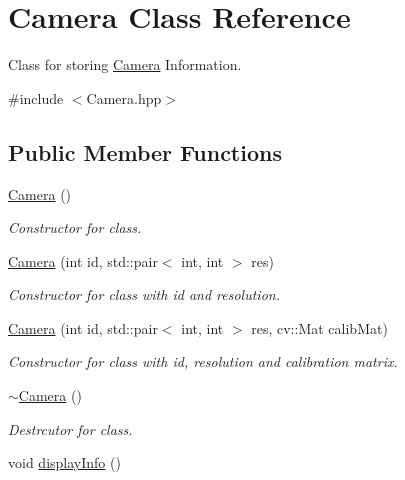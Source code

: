 \hypertarget{classCamera}{}\section{Camera Class Reference}
\label{classCamera}


Class for storing \hyperlink{classCamera}{Camera} Information.  




{\ttfamily \#include $<$Camera.\+hpp$>$}

\subsection*{Public Member Functions}
\begin{DoxyCompactItemize}
\item 
\hyperlink{classCamera_a01f94c3543f56ede7af49dc778f19331}{Camera} ()\hypertarget{classCamera_a01f94c3543f56ede7af49dc778f19331}{}\label{classCamera_a01f94c3543f56ede7af49dc778f19331}

\begin{DoxyCompactList}\small\item\em Constructor for class. \end{DoxyCompactList}\item 
\hyperlink{classCamera_a269c89c4173abede022f61f662d9343b}{Camera} (int id, std\+::pair$<$ int, int $>$ res)
\begin{DoxyCompactList}\small\item\em Constructor for class with id and resolution. \end{DoxyCompactList}\item 
\hyperlink{classCamera_a3e25c1208e4cb1fed69b7750a8ee918b}{Camera} (int id, std\+::pair$<$ int, int $>$ res, cv\+::\+Mat calib\+Mat)
\begin{DoxyCompactList}\small\item\em Constructor for class with id, resolution and calibration matrix. \end{DoxyCompactList}\item 
\hyperlink{classCamera_ad1897942d0ccf91052386388a497349f}{$\sim$\+Camera} ()\hypertarget{classCamera_ad1897942d0ccf91052386388a497349f}{}\label{classCamera_ad1897942d0ccf91052386388a497349f}

\begin{DoxyCompactList}\small\item\em Destrcutor for class. \end{DoxyCompactList}\item 
void \hyperlink{classCamera_ace29bb6ed733ab52f33a6896c2615ba8}{display\+Info} ()\hypertarget{classCamera_ace29bb6ed733ab52f33a6896c2615ba8}{}\label{classCamera_ace29bb6ed733ab52f33a6896c2615ba8}


\end{DoxyCompactItemize}
